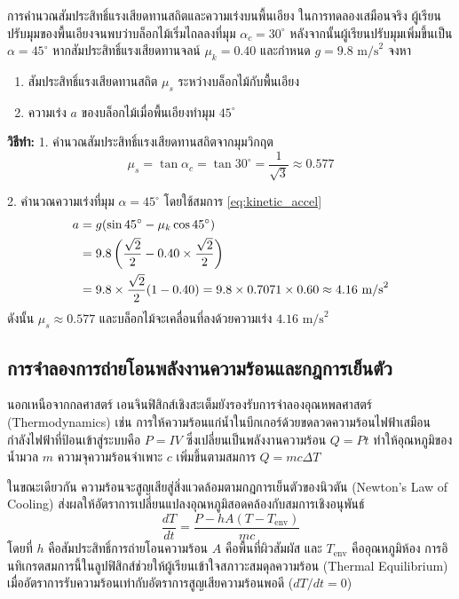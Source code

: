 \begin{workedexamplebox}{การคำนวณสัมประสิทธิ์แรงเสียดทานสถิตและความเร่งบนพื้นเอียง}
ในการทดลองเสมือนจริง ผู้เรียนปรับมุมของพื้นเอียงจนพบว่าบล็อกไม้เริ่มไถลลงที่มุม $\alpha_c = 30^\circ$ หลังจากนั้นผู้เรียนปรับมุมเพิ่มขึ้นเป็น $\alpha = 45^\circ$ หากสัมประสิทธิ์แรงเสียดทานจลน์ $\mu_k = 0.40$ และกำหนด $g = 9.8\text{ m/s}^2$ จงหา
\begin{enumerate}
    \item สัมประสิทธิ์แรงเสียดทานสถิต $\mu_s$ ระหว่างบล็อกไม้กับพื้นเอียง
    \item ความเร่ง $a$ ของบล็อกไม้เมื่อพื้นเอียงทำมุม $45^\circ$
\end{enumerate}

\textbf{วิธีทำ:}
1. คำนวณสัมประสิทธิ์แรงเสียดทานสถิตจากมุมวิกฤต
\begin{equation}
\mu_s = \tan\alpha_c = \tan 30^\circ = \frac{1}{\sqrt{3}} \approx 0.577
\end{equation}

2. คำนวณความเร่งที่มุม $\alpha = 45^\circ$ โดยใช้สมการ \eqref{eq:kinetic_accel}
\begin{align}
a &= g(\sin 45^\circ - \mu_k \cos 45^\circ) \notag \\
&= 9.8 \left(\frac{\sqrt{2}}{2} - 0.40 \times \frac{\sqrt{2}}{2}\right) \notag \\
&= 9.8 \times \frac{\sqrt{2}}{2} (1 - 0.40) = 9.8 \times 0.7071 \times 0.60 \approx 4.16\text{ m/s}^2
\end{align}
ดังนั้น $\mu_s \approx 0.577$ และบล็อกไม้จะเคลื่อนที่ลงด้วยความเร่ง $4.16\text{ m/s}^2$
\end{workedexamplebox}

\subsection{การจำลองการถ่ายโอนพลังงานความร้อนและกฎการเย็นตัว}

นอกเหนือจากกลศาสตร์ เอนจินฟิสิกส์เชิงสะเต็มยังรองรับการจำลองอุณหพลศาสตร์ (Thermodynamics) เช่น การให้ความร้อนแก่น้ำในบีกเกอร์ด้วยขดลวดความร้อนไฟฟ้าเสมือน กำลังไฟฟ้าที่ป้อนเข้าสู่ระบบคือ $P = IV$ ซึ่งเปลี่ยนเป็นพลังงานความร้อน $Q = Pt$ ทำให้อุณหภูมิของน้ำมวล $m$ ความจุความร้อนจำเพาะ $c$ เพิ่มขึ้นตามสมการ $Q = mc\Delta T$

ในขณะเดียวกัน ความร้อนจะสูญเสียสู่สิ่งแวดล้อมตามกฎการเย็นตัวของนิวตัน (Newton's Law of Cooling) ส่งผลให้อัตราการเปลี่ยนแปลงอุณหภูมิสอดคล้องกับสมการเชิงอนุพันธ์
\begin{equation}
\frac{dT}{dt} = \frac{P - hA(T - T_{\text{env}})}{mc} \label{eq:thermo_cooling}
\end{equation}
โดยที่ $h$ คือสัมประสิทธิ์การถ่ายโอนความร้อน $A$ คือพื้นที่ผิวสัมผัส และ $T_{\text{env}}$ คืออุณหภูมิห้อง การอินทิเกรตสมการนี้ในลูปฟิสิกส์ช่วยให้ผู้เรียนเข้าใจสภาวะสมดุลความร้อน (Thermal Equilibrium) เมื่ออัตราการรับความร้อนเท่ากับอัตราการสูญเสียความร้อนพอดี ($dT/dt = 0$)

